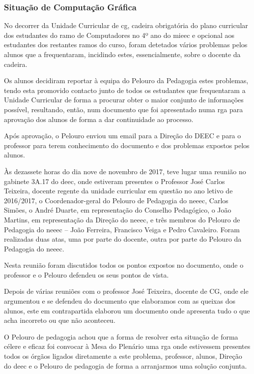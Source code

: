 
\subsubsection{Situação de Computação Gráfica}

No decorrer da Unidade Curricular de \acrfull{cg}, cadeira obrigatória do plano curricular dos estudantes do ramo de Computadores no 4º ano do \acrfull{mieec} e opcional aos estudantes dos restantes ramos do curso, foram detetados vários problemas pelos alunos que a frequentaram, incidindo estes, essencialmente, sobre o docente da cadeira.

Os alunos decidiram reportar à equipa do Pelouro da Pedagogia estes problemas, tendo esta promovido contacto junto de todos os estudantes que frequentaram a Unidade Curricular de forma a procurar obter o maior conjunto de informações possível, resultando, então, num documento que foi apresentado numa \acrshort{rga} para aprovação dos alunos de forma a dar continuidade ao processo.

Após aprovação, o Pelouro enviou um email para a Direção do DEEC e para o professor para terem conhecimento do documento e dos problemas expostos pelos alunos.

Às dezassete horas do dia nove de novembro de 2017, teve lugar uma reunião no gabinete 3A.17 do \acrshort{deec}, onde estiveram presentes o Professor José Carlos Teixeira, docente regente da unidade curricular em questão no ano letivo de 2016/2017, o Coordenador-geral do Pelouro de Pedagogia do \acrshort{neeec}, Carlos Simões, o André  Duarte, em representação do Conselho Pedagógico, o João Martins, em  representação da Direção do \acrshort{neeec}, e três membros do Pelouro de Pedagogia do \acrshort{neeec} – João Ferreira, Francisco Veiga e Pedro Cavaleiro. Foram realizadas duas atas, uma por parte do docente, outra por parte do Pelouro da Pedagogia do \acrshort{neeec}.

Nesta reunião foram discutidos todos os pontos expostos no documento, onde o professor e o Pelouro defendeu os seus pontos de vista.

Depois de várias reuniões com o professor José Teixeira, docente de CG, onde ele argumentou e se defendeu do documento que elaboramos com as queixas dos alunos, este em contrapartida elaborou um documento onde apresenta tudo o que acha incorreto ou que não aconteceu.

O Pelouro de pedagogia achou que a forma de resolver esta situação de forma célere e eficaz foi convocar à Mesa do Plenário uma \acrshort{rga} onde estivessem presentes todos os órgãos ligados diretamente a este problema, professor, alunos, Direção do \acrshort{deec} e o Pelouro de pedagogia de forma a arranjarmos uma solução conjunta.

